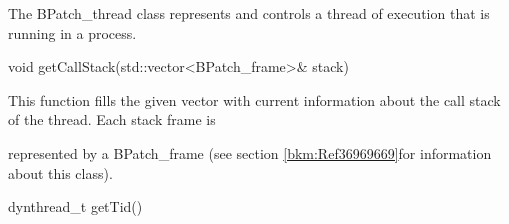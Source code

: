 {

The BPatch_thread class represents and controls a thread of execution that is running in a process.}





\bigskip



{

void getCallStack(std::vector<BPatch_frame>& stack)}



{

This function fills the given vector with current information about the call stack of the thread. Each stack frame is

represented by a BPatch_frame (see section \ref{bkm:Ref36969669}for information about this class).}





\bigskip



{

dynthread_t getTid()}



